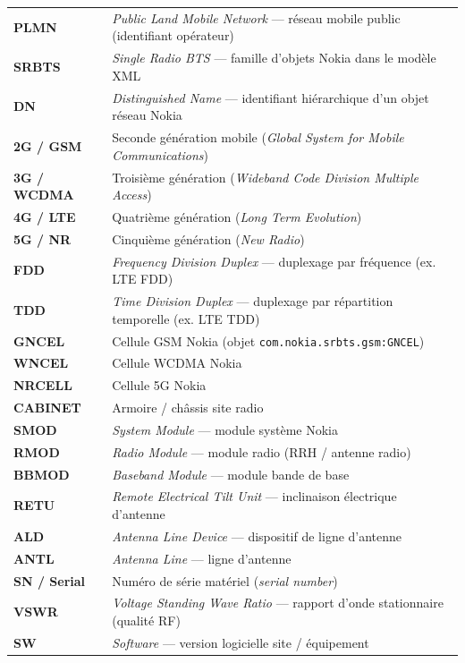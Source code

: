\documentclass[12pt,a4paper]{report}
\begin{document}
\begin{longtable}{@{}p{3.4cm}p{10.3cm}@{}}
\textbf{PLMN} & \textit{Public Land Mobile Network} — réseau mobile public (identifiant opérateur) \\
\textbf{SRBTS} & \textit{Single Radio BTS} — famille d'objets Nokia dans le modèle XML \\
\textbf{DN} & \textit{Distinguished Name} — identifiant hiérarchique d'un objet réseau Nokia \\
\textbf{2G / GSM} & Seconde génération mobile (\textit{Global System for Mobile Communications}) \\
\textbf{3G / WCDMA} & Troisième génération (\textit{Wideband Code Division Multiple Access}) \\
\textbf{4G / LTE} & Quatrième génération (\textit{Long Term Evolution}) \\
\textbf{5G / NR} & Cinquième génération (\textit{New Radio}) \\
\textbf{FDD} & \textit{Frequency Division Duplex} — duplexage par fréquence (ex. LTE FDD) \\
\textbf{TDD} & \textit{Time Division Duplex} — duplexage par répartition temporelle (ex. LTE TDD) \\
\textbf{GNCEL} & Cellule GSM Nokia (objet \texttt{com.nokia.srbts.gsm:GNCEL}) \\
\textbf{WNCEL} & Cellule WCDMA Nokia \\
\textbf{NRCELL} & Cellule 5G Nokia \\
\textbf{CABINET} & Armoire / châssis site radio \\
\textbf{SMOD} & \textit{System Module} — module système Nokia \\
\textbf{RMOD} & \textit{Radio Module} — module radio (RRH / antenne radio) \\
\textbf{BBMOD} & \textit{Baseband Module} — module bande de base \\
\textbf{RETU} & \textit{Remote Electrical Tilt Unit} — inclinaison électrique d'antenne \\
\textbf{ALD} & \textit{Antenna Line Device} — dispositif de ligne d'antenne \\
\textbf{ANTL} & \textit{Antenna Line} — ligne d'antenne \\
\textbf{SN / Serial} & Numéro de série matériel (\textit{serial number}) \\
\textbf{VSWR} & \textit{Voltage Standing Wave Ratio} — rapport d'onde stationnaire (qualité RF) \\
\textbf{SW} & \textit{Software} — version logicielle site / équipement \\

\end{longtable}
\end{document}
